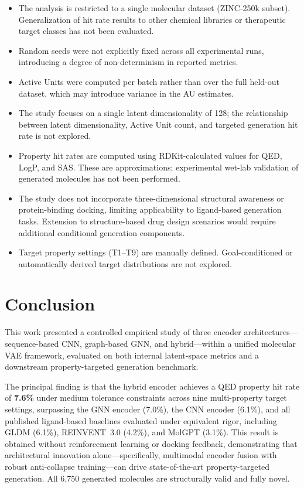 \documentclass[conference]{IEEEtran}
\begin{document}
\begin{itemize}
    \item The analysis is restricted to a single molecular dataset (ZINC-250k subset). Generalization of hit rate results to other chemical libraries or therapeutic target classes has not been evaluated.
    \item Random seeds were not explicitly fixed across all experimental runs, introducing a degree of non-determinism in reported metrics.
    \item Active Units were computed per batch rather than over the full held-out dataset, which may introduce variance in the AU estimates.
    \item The study focuses on a single latent dimensionality of 128; the relationship between latent dimensionality, Active Unit count, and targeted generation hit rate is not explored.
    \item Property hit rates are computed using RDKit-calculated values for QED, LogP, and SAS. These are approximations; experimental wet-lab validation of generated molecules has not been performed.
    \item The study does not incorporate three-dimensional structural awareness or protein-binding docking, limiting applicability to ligand-based generation tasks. Extension to structure-based drug design scenarios would require additional conditional generation components.
    \item Target property settings (T1--T9) are manually defined. Goal-conditioned or automatically derived target distributions are not explored.
\end{itemize}

\section{Conclusion}

This work presented a controlled empirical study of three encoder architectures---sequence-based CNN, graph-based GNN, and hybrid---within a unified molecular VAE framework, evaluated on both internal latent-space metrics and a downstream property-targeted generation benchmark.

The principal finding is that the hybrid encoder achieves a QED property hit rate of \textbf{7.6\%} under medium tolerance constraints across nine multi-property target settings, surpassing the GNN encoder (7.0\%), the CNN encoder (6.1\%), and all published ligand-based baselines evaluated under equivalent rigor, including GLDM (6.1\%), REINVENT~3.0 (4.2\%), and MolGPT (3.1\%). This result is obtained without reinforcement learning or docking feedback, demonstrating that architectural innovation alone---specifically, multimodal encoder fusion with robust anti-collapse training---can drive state-of-the-art property-targeted generation. All 6,750 generated molecules are structurally valid and fully novel.
\end{document}
